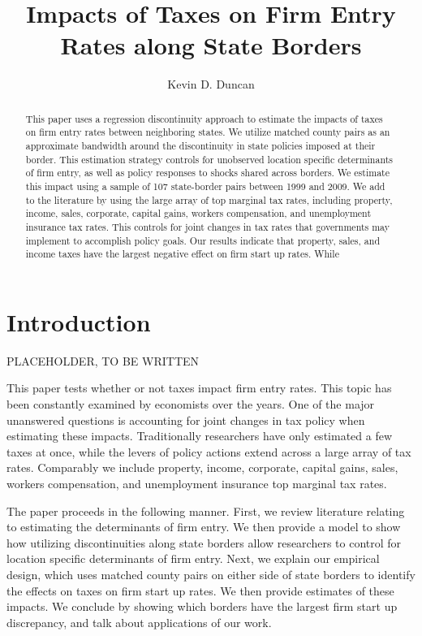 \documentclass[12pt,a4paper]{article}
\begin{document}
\title{Impacts of Taxes on Firm Entry Rates along State Borders}
\author{Kevin D. Duncan}
\date{}
\maketitle

\begin{abstract}
This paper uses a regression discontinuity approach to estimate the impacts of taxes on firm entry rates between neighboring states. We utilize matched county pairs as an approximate bandwidth around the discontinuity in state policies imposed at their border. This estimation strategy controls for unobserved location specific determinants of firm entry, as well as policy responses to shocks shared across borders. We estimate this impact using a sample of 107 state-border pairs between 1999 and 2009. We add to the literature by using the large array of top marginal tax rates, including property, income, sales, corporate, capital gains, workers compensation, and unemployment insurance tax rates. This controls for joint changes in tax rates that governments may implement to accomplish policy goals. Our results indicate that property, sales, and income taxes have the largest negative effect on firm start up rates. While 
\end{abstract}

\newpage

\section{Introduction} 

PLACEHOLDER, TO BE WRITTEN

This paper tests whether or not taxes impact firm entry rates. This topic has been constantly examined by economists over the years. One of the major unanswered questions is accounting for joint changes in tax policy when estimating these impacts. Traditionally researchers have only estimated a few taxes at once, while the levers of policy actions extend across a large array of tax rates. Comparably we include property, income, corporate, capital gains, sales, workers compensation, and unemployment insurance top marginal tax rates.

The paper proceeds in the following manner. First, we review literature relating to estimating the determinants of firm entry. We then provide a model to show how utilizing discontinuities along state borders allow researchers to control for location specific determinants of firm entry. Next, we explain our empirical design, which uses matched county pairs on either side of state borders to identify the effects on taxes on firm start up rates. We then provide estimates of these impacts. We conclude by showing which borders have the largest firm start up discrepancy, and talk about applications of our work.
\end{document}
